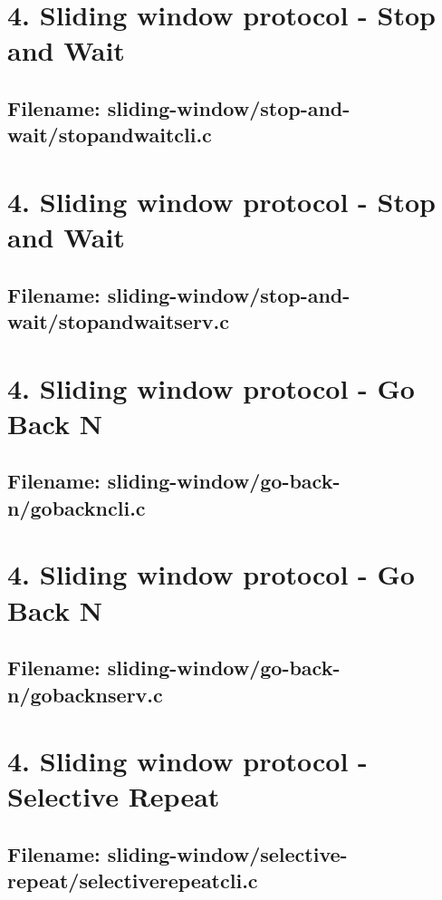\documentclass{article}
\begin{document}
\newpage
\section*{4. Sliding window protocol - Stop and Wait}
\subsection*{Filename: sliding-window/stop-and-wait/stopandwaitcli.c}


\newpage
\section*{4. Sliding window protocol - Stop and Wait}
\subsection*{Filename: sliding-window/stop-and-wait/stopandwaitserv.c}


\newpage
\section*{4. Sliding window protocol - Go Back N}
\subsection*{Filename: sliding-window/go-back-n/gobackncli.c}


\newpage
\section*{4. Sliding window protocol - Go Back N}
\subsection*{Filename: sliding-window/go-back-n/gobacknserv.c}


\newpage
\section*{4. Sliding window protocol - Selective Repeat}
\subsection*{Filename: sliding-window/selective-repeat/selectiverepeatcli.c}

\end{document}
